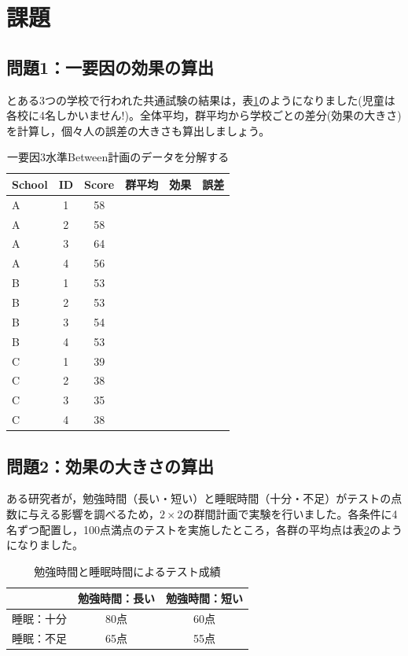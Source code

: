 \documentclass{ltjbook}
\begin{document}
\section{課題}

\subsection{問題1：一要因の効果の算出}
とある3つの学校で行われた共通試験の結果は，表\ref{tbl:18_07}のようになりました(児童は各校に4名しかいません!)。全体平均，群平均から学校ごとの差分(効果の大きさ)を計算し，個々人の誤差の大きさも算出しましょう。
\begin{table}[ht]
	\centering
	\caption{一要因3水準Between計画のデータを分解する}
	\begin{tabular}{lccccc}
		\hline
		School & ID & Score & 群平均 & 効果 & 誤差 \\
		\hline
		A      & 1  & 58    &     &    &    \\
		A      & 2  & 58    &     &    &    \\
		A      & 3  & 64    &     &    &    \\
		A      & 4  & 56    &     &    &    \\
		B      & 1  & 53    &     &    &    \\
		B      & 2  & 53    &     &    &    \\
		B      & 3  & 54    &     &    &    \\
		B      & 4  & 53    &     &    &    \\
		C      & 1  & 39    &     &    &    \\
		C      & 2  & 38    &     &    &    \\
		C      & 3  & 35    &     &    &    \\
		C      & 4  & 38    &     &    &    \\
		\hline
	\end{tabular}
	\label{tbl:18_07}
\end{table}

\subsection{問題2：効果の大きさの算出}

ある研究者が，勉強時間（長い・短い）と睡眠時間（十分・不足）がテストの点数に与える影響を調べるため，$2\times2$の群間計画で実験を行いました。各条件に4名ずつ配置し，100点満点のテストを実施したところ，各群の平均点は表\ref{tbl:18_08}のようになりました。

\begin{table}[ht]
	\centering
	\caption{勉強時間と睡眠時間によるテスト成績}
	\begin{tabular}{c|cc}
		          & 勉強時間：長い & 勉強時間：短い \\ \hline
		睡眠：十分 & 80点        & 60点        \\
		睡眠：不足 & 65点        & 55点        \\ \hline
	\end{tabular}
	\label{tbl:18_08}
\end{table}
\end{document}
